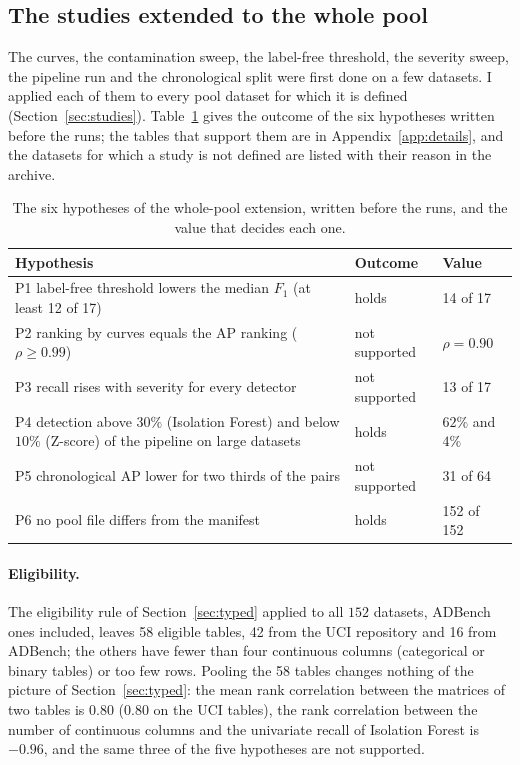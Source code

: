\documentclass[conference]{IEEEtran}
\begin{document}
\subsection{The studies extended to the whole pool}
\label{sec:pool-all}
The curves, the contamination sweep, the label-free threshold, the severity sweep, the pipeline run and the chronological split were first done on a few datasets. I applied each of them to every pool dataset for which it is defined (Section~\ref{sec:studies}). Table~\ref{tab:pool-hyp} gives the outcome of the six hypotheses written before the runs; the tables that support them are in Appendix~\ref{app:details}, and the datasets for which a study is not defined are listed with their reason in the archive.

\begin{table}[t]
\caption{The six hypotheses of the whole-pool extension, written before the runs, and the value that decides each one.}
\label{tab:pool-hyp}
\centering
\footnotesize
\setlength{\tabcolsep}{3pt}
\begin{tabular}{p{}p{}p{}}
\toprule
Hypothesis & Outcome & Value \\
\midrule
P1 label-free threshold lowers the median $F_1$ (at least 12 of 17) & holds & 14 of 17 \\
P2 ranking by curves equals the AP ranking ($\rho \geq 0.99$) & not supported & $\rho = 0.90$ \\
P3 recall rises with severity for every detector & not supported & 13 of 17 \\
P4 detection above $30\%$ (Isolation Forest) and below $10\%$ (Z-score) of the pipeline on large datasets & holds & $62\%$ and $4\%$ \\
P5 chronological AP lower for two thirds of the pairs & not supported & 31 of 64 \\
P6 no pool file differs from the manifest & holds & 152 of 152 \\
\bottomrule
\end{tabular}
\end{table}

\paragraph{Eligibility.} The eligibility rule of Section~\ref{sec:typed} applied to all $152$ datasets, ADBench ones included, leaves 58 eligible tables, 42 from the UCI repository and 16 from ADBench; the others have fewer than four continuous columns (categorical or binary tables) or too few rows. Pooling the 58 tables changes nothing of the picture of Section~\ref{sec:typed}: the mean rank correlation between the matrices of two tables is $0.80$ ($0.80$ on the UCI tables), the rank correlation between the number of continuous columns and the univariate recall of Isolation Forest is $-0.96$, and the same three of the five hypotheses are not supported.
\end{document}
